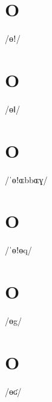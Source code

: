 \documentclass[10pt,a4paper,twoside]{book}
\begin{document}
\section*{O}

\begin{multicols}{3}
 {/ɵǃ/} {}
\end{multicols}

\section*{O}

\begin{multicols}{3}
 {/ɵǁ/} {}
\end{multicols}

\section*{O}

\begin{multicols}{3}
 {/ˈɵǃɶbbɶɣ/} {}
\end{multicols}

\section*{O}

\begin{multicols}{3}
 {/ˈɵǃɵq/} {}
\end{multicols}

\section*{O}

\begin{multicols}{3}
 {/ɵg/} {}
\end{multicols}

\section*{O}

\begin{multicols}{3}
 {/ɵʛ/} {}
\end{multicols}
\end{document}
